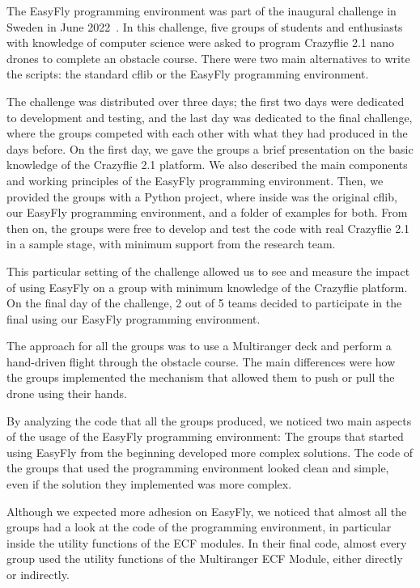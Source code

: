 The EasyFly programming environment was part of the inaugural challenge in Sweden in June 2022~\cite{dronearenaChallenge}. 
In this challenge, five groups of students and enthusiasts with knowledge of computer science were asked to program Crazyflie 2.1 nano drones to complete an obstacle course.
There were two main alternatives to write the scripts: the standard cflib or the EasyFly programming environment. 

The challenge was distributed over three days; the first two days were dedicated to development and testing, and the last day was dedicated to the final challenge, where the groups competed with each other with what they had produced in the days before.
On the first day, we gave the groups a brief presentation on the basic knowledge of the Crazyflie 2.1 platform. 
We also described the main components and working principles of the EasyFly programming environment.
Then, we provided the groups with a Python project, where inside was the original cflib, our EasyFly programming environment, and a folder of examples for both.
From then on, the groups were free to develop and test the code with real Crazyflie 2.1 in a sample stage, with minimum support from the research team.

This particular setting of the challenge allowed us to see and measure the impact of using EasyFly on a group with minimum knowledge of the Crazyflie platform. 
On the final day of the challenge, 2 out of 5 teams decided to participate in the final using our EasyFly programming environment. 

The approach for all the groups was to use a Multiranger deck and perform a hand-driven flight through the obstacle course.
The main differences were how the groups implemented the mechanism that allowed them to push or pull the drone using their hands.

By analyzing the code that all the groups produced, we noticed two main aspects of the usage of the EasyFly programming environment:
The groups that started using EasyFly from the beginning developed more complex solutions.
The code of the groups that used the programming environment looked clean and simple, even if the solution they implemented was more complex.

Although we expected more adhesion on EasyFly, we noticed that almost all the groups had a look at the code of the programming environment, in particular inside the utility functions of the ECF modules. 
In their final code, almost every group used the utility functions of the Multiranger ECF Module, either directly or indirectly.

